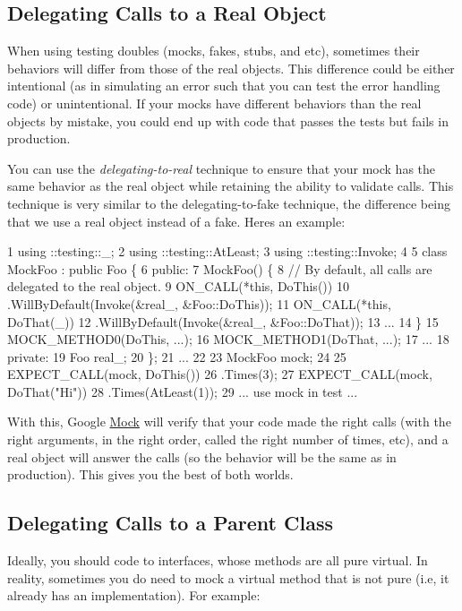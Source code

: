 \subsection*{Delegating Calls to a Real Object}

When using testing doubles (mocks, fakes, stubs, and etc), sometimes their behaviors will differ from those of the real objects. This difference could be either intentional (as in simulating an error such that you can test the error handling code) or unintentional. If your mocks have different behaviors than the real objects by mistake, you could end up with code that passes the tests but fails in production.

You can use the {\itshape delegating-\/to-\/real} technique to ensure that your mock has the same behavior as the real object while retaining the ability to validate calls. This technique is very similar to the delegating-\/to-\/fake technique, the difference being that we use a real object instead of a fake. Here\textquotesingle{}s an example\+:


\begin{DoxyCode}
1 using ::testing::\_;
2 using ::testing::AtLeast;
3 using ::testing::Invoke;
4 
5 class MockFoo : public Foo \{
6  public:
7   MockFoo() \{
8     // By default, all calls are delegated to the real object.
9     ON\_CALL(*this, DoThis())
10         .WillByDefault(Invoke(&real\_, &Foo::DoThis));
11     ON\_CALL(*this, DoThat(\_))
12         .WillByDefault(Invoke(&real\_, &Foo::DoThat));
13     ...
14   \}
15   MOCK\_METHOD0(DoThis, ...);
16   MOCK\_METHOD1(DoThat, ...);
17   ...
18  private:
19   Foo real\_;
20 \};
21 ...
22 
23   MockFoo mock;
24 
25   EXPECT\_CALL(mock, DoThis())
26       .Times(3);
27   EXPECT\_CALL(mock, DoThat("Hi"))
28       .Times(AtLeast(1));
29   ... use mock in test ...
\end{DoxyCode}


With this, Google \hyperlink{class_mock}{Mock} will verify that your code made the right calls (with the right arguments, in the right order, called the right number of times, etc), and a real object will answer the calls (so the behavior will be the same as in production). This gives you the best of both worlds.

\subsection*{Delegating Calls to a Parent Class}

Ideally, you should code to interfaces, whose methods are all pure virtual. In reality, sometimes you do need to mock a virtual method that is not pure (i.\+e, it already has an implementation). For example\+:


